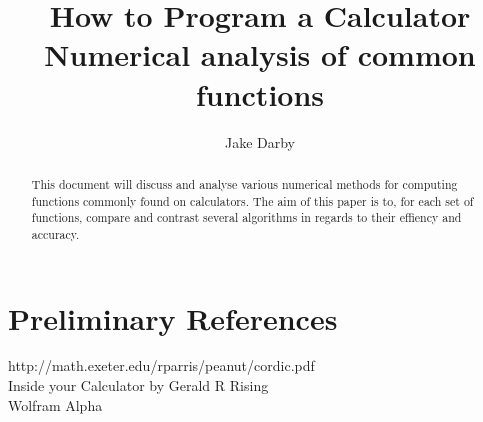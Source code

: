 \documentclass[12pt]{article}
\numberwithin{equation}{subsection}
\begin{document}
\author{Jake Darby}
\title{How to Program a Calculator \\ \large Numerical analysis of common functions}
\date{}
\maketitle

\begin{abstract}
\begin{center}
This document will discuss and analyse various numerical methods for computing functions commonly found on calculators. The aim of this paper is to, for each set of functions, compare and contrast several algorithms in regards to their effiency and accuracy.
\end{center}
\end{abstract}

\newpage
\tableofcontents
\newpage



%





\section{Preliminary References}
http://math.exeter.edu/rparris/peanut/cordic.pdf \\
Inside your Calculator by Gerald R Rising \\
Wolfram Alpha \\

\appendix
%
\end{document}
